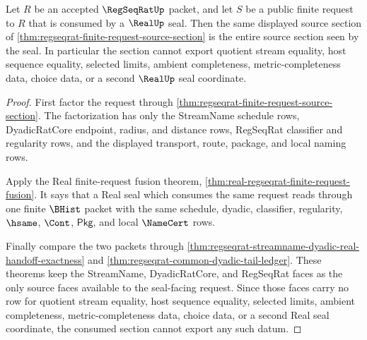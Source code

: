 \begin{theorem}
\label{thm:regseqrat-real-request-section-nonescape}
Let $R$ be an accepted $\RegSeqRatUp$ packet, and let $S$ be a public finite
request to $R$ that is consumed by a $\RealUp$ seal. Then the same displayed
source section of
\autoref{thm:regseqrat-finite-request-source-section} is the entire source
section seen by the seal. In particular the section cannot export quotient
stream equality, host sequence equality, selected limits, ambient completeness,
metric-completeness data, choice data, or a second $\RealUp$ seal coordinate.
\end{theorem}
\begin{proof}
First factor the request through
\autoref{thm:regseqrat-finite-request-source-section}. The factorization has
only the StreamName schedule rows, DyadicRatCore endpoint, radius, and distance
rows, RegSeqRat classifier and regularity rows, and the displayed transport,
route, package, and local naming rows.

Apply the Real finite-request fusion theorem,
\autoref{thm:real-regseqrat-finite-request-fusion}. It says that a Real seal
which consumes the same request reads through one finite $\BHist$ packet with
the same schedule, dyadic, classifier, regularity, $\hsame$, $\Cont$,
$\mathsf{Pkg}$, and local $\NameCert$ rows.

Finally compare the two packets through
\autoref{thm:regseqrat-streamname-dyadic-real-handoff-exactness} and
\autoref{thm:regseqrat-common-dyadic-tail-ledger}. These theorems keep the
StreamName, DyadicRatCore, and RegSeqRat faces as the only source faces
available to the seal-facing request. Since those faces carry no row for
quotient stream equality, host sequence equality, selected limits, ambient
completeness, metric-completeness data, choice data, or a second Real seal
coordinate, the consumed section cannot export any such datum.
\end{proof}

